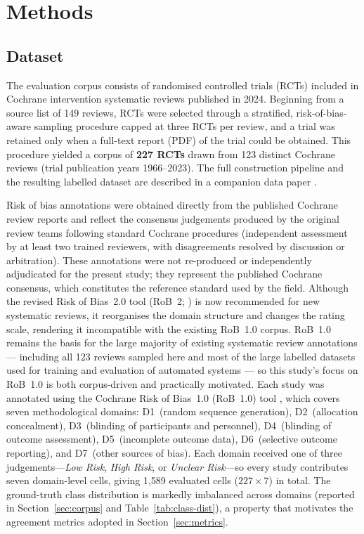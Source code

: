 \documentclass[../main.tex]{subfiles}
\begin{document}
\section{Methods}
\label{sec:methods}

\subsection{Dataset}
\label{sec:dataset}

The evaluation corpus consists of randomised controlled trials (RCTs) included
in Cochrane intervention systematic reviews published in 2024.
Beginning from a source list of 149 reviews, RCTs were selected through a
stratified, risk-of-bias-aware sampling procedure capped at three RCTs per
review, and a trial was retained only when a full-text report (PDF) of the
trial could be obtained.
This procedure yielded a corpus of \textbf{227 RCTs} drawn from 123 distinct
Cochrane reviews (trial publication years 1966--2023).
The full construction pipeline and the resulting labelled dataset are described
in a companion data paper \citep{Dataset2026}.

Risk of bias annotations were obtained directly from the published Cochrane
review reports and reflect the consensus judgements produced by the original
review teams following standard Cochrane procedures (independent assessment by
at least two trained reviewers, with disagreements resolved by discussion or
arbitration).
These annotations were not re-produced or independently adjudicated for the
present study; they represent the published Cochrane consensus, which constitutes
the reference standard used by the field.
Although the revised Risk of Bias~2.0 tool (RoB~2; \citealt{Sterne2019}) is
now recommended for new systematic reviews, it reorganises the domain structure
and changes the rating scale, rendering it incompatible with the existing
RoB~1.0 corpus.
RoB~1.0 remains the basis for the large majority of existing systematic review
annotations --- including all 123 reviews sampled here and most of the large
labelled datasets used for training and evaluation of automated systems --- so
this study's focus on RoB~1.0 is both corpus-driven and practically motivated.
Each study was annotated using the Cochrane Risk of Bias~1.0 (RoB~1.0) tool
\citep{Higgins2011}, which covers seven methodological domains:
D1~(random sequence generation),
D2~(allocation concealment),
D3~(blinding of participants and personnel),
D4~(blinding of outcome assessment),
D5~(incomplete outcome data),
D6~(selective outcome reporting), and
D7~(other sources of bias).
Each domain received one of three judgements---\emph{Low Risk}, \emph{High Risk},
or \emph{Unclear Risk}---so every study contributes seven domain-level cells,
giving 1{,}589 evaluated cells ($227 \times 7$) in total.
The ground-truth class distribution is markedly imbalanced across domains
(reported in Section~\ref{sec:corpus} and Table~\ref{tab:class-dist}), a property
that motivates the agreement metrics adopted in Section~\ref{sec:metrics}.
\end{document}
